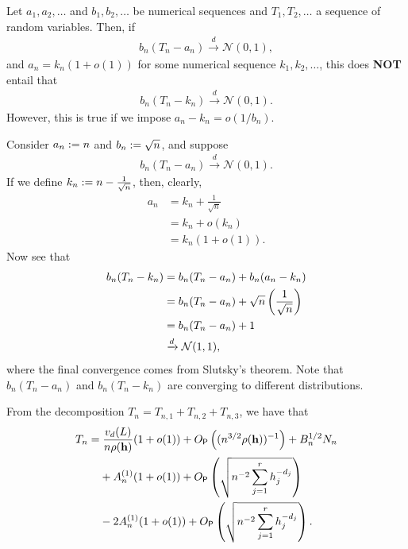 \documentclass{article}
\begin{document}
\begin{remark}
    Let $a_1,a_2,\dots$ and $b_1,b_2,\dots$ be numerical sequences and $T_1,T_2,\dots$ a sequence of random variables. Then, if
    \begin{align*}
        b_n(T_n - a_n) \xrightarrow{d} \mathcal{N}(0, 1),
    \end{align*}
    and $a_n = k_n(1+o(1))$ for some numerical sequence $k_1,k_2,\dots$, this does \textbf{NOT} entail that 
    \begin{align*}
        b_n(T_n - k_n) \xrightarrow{d} \mathcal{N}(0, 1).
    \end{align*}
    However, this is true if we impose $a_n - k_n = o(1/b_n)$.
\end{remark}

\begin{example}
    Consider $a_n := n$ and $b_n := \sqrt{n}$, and suppose
    \begin{align*}
        b_n(T_n - a_n) \xrightarrow{d} \mathcal{N}(0, 1).
    \end{align*}
    If we define $k_n := n - \frac{1}{\sqrt{n}}$, then, clearly,
    \begin{align*}
        a_n &= k_n + \frac{1}{\sqrt{n}} \\
        &= k_n + o(k_n) \\
        &= k_n(1+o(1)).
    \end{align*}
    Now see that
    \begin{align*}
        b_n(T_n - k_n) &= b_n(T_n - a_n) + b_n(a_n - k_n)\\
        &= b_n(T_n - a_n) + \sqrt{n} \left(\frac{1}{\sqrt{n}}\right) \\
        &= b_n(T_n - a_n) + 1 \\
        &\xrightarrow{d} \mathcal{N}(1, 1),
    \end{align*}
    where the final convergence comes from Slutsky's theorem. Note that $b_n(T_n - a_n)$ and $b_n(T_n - k_n)$ are converging to different distributions.
\end{example}

From the decomposition $T_n = T_{n,1} + T_{n,2} + T_{n,3}$, we have that
\begin{align*}
    T_n =&\; \frac{v_d(L)}{n \rho (\mathbf h)} (1+o(1)) + O_{\mathsf{P}}\left((n^{3/2} \rho (\mathbf h))^{-1}\right) + B_n^{1/2} N_n \\
    &+ A_n^{(1)}(1+o(1)) + O_{\mathsf{P}} \left(\sqrt{n^{-2} \sum_{j=1}^{r} h_j^{-d_j} }\right) \\
    &- 2A_n^{(1)}(1+o(1)) + O_{\mathsf{P}} \left(\sqrt{n^{-2} \sum_{j=1}^{r} h_j^{-d_j} }\right).
\end{align*}
\end{document}
